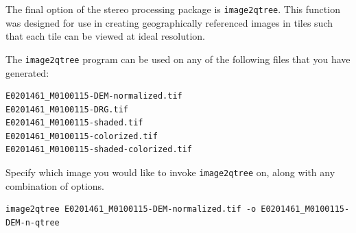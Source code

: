 The final option of the stereo processing package is \texttt{image2qtree}.
This function was designed for use in creating geographically
referenced images in tiles such that each tile can be viewed at
ideal resolution.

The \texttt{image2qtree} program can be used on any of the following files that you 
have generated:
\begin{verbatim}
E0201461_M0100115-DEM-normalized.tif
E0201461_M0100115-DRG.tif 
E0201461_M0100115-shaded.tif
E0201461_M0100115-colorized.tif
E0201461_M0100115-shaded-colorized.tif
\end{verbatim}

Specify which image you would like to invoke \texttt{image2qtree} on, along
with any combination of options.

\begin{verbatim}
image2qtree E0201461_M0100115-DEM-normalized.tif -o E0201461_M0100115-DEM-n-qtree
\end{verbatim}


